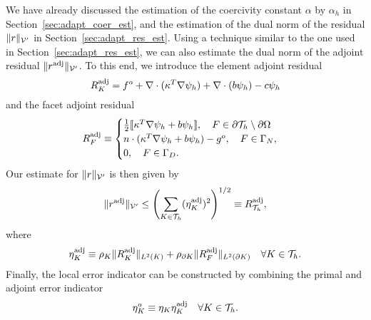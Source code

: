 We have already discussed the estimation of the coercivity constant $\alpha$ by $\alpha_h$ in Section~\ref{sec:adapt_coer_est}, and the estimation of the dual norm of the residual $\| r \|_{\mathcal{V}'}$ in Section~\ref{sec:adapt_res_est}. Using a technique similar to the one used in Section~\ref{sec:adapt_res_est}, we can also estimate the dual norm of the adjoint residual $\| r^{\rm adj} \|_{\mathcal{V}'}$. To this end, we introduce the element adjoint residual 
\begin{equation*}
  R_K^{\rm adj} = f^o + \nabla \cdot (\kappa^T \nabla \psi_h) + \nabla \cdot (b \psi_h) - c \psi_h
\end{equation*}
and the facet adjoint residual 
\begin{equation*}
  R_F^{\rm adj} \equiv
  \begin{cases}
    \frac{1}{2} \llbracket \kappa^T \nabla \psi_h + b \psi_h \rrbracket, \quad F \in \partial \mathcal{T}_h \setminus \partial \Omega \\
    n \cdot (\kappa^T \nabla \psi_h + b \psi_h) - g^o,  \quad F \in \Gamma_N, \\
    0, \quad F \in \Gamma_D.
  \end{cases}
\end{equation*}
Our estimate for $\| r \|_{\mathcal{V}'}$ is then given by
\begin{equation*}
  \| r^{\rm adj} \|_{\mathcal{V}'} \leq  \left(\sum_{K \in \mathcal{T}_h} (\eta^{\rm adj}_K)^2 \right)^{1/2} \equiv R_{\mathcal{T}_h}^{\rm adj},
\end{equation*}
where
\begin{equation*}
  \eta_K^{\rm adj} \equiv  \rho_K \| R^{\rm adj}_K \|_{L^2(K)} + \rho_{\partial K} \| R^{\rm adj}_F \|_{L^2(\partial K)} \quad \forall K \in \mathcal{T}_h.
\end{equation*}
Finally, the local error indicator can be constructed by combining the primal and adjoint error indicator
\begin{equation*}
  \eta^o_K \equiv \eta_K \eta^{\rm adj}_K \quad \forall K \in \mathcal{T}_h.
\end{equation*}

